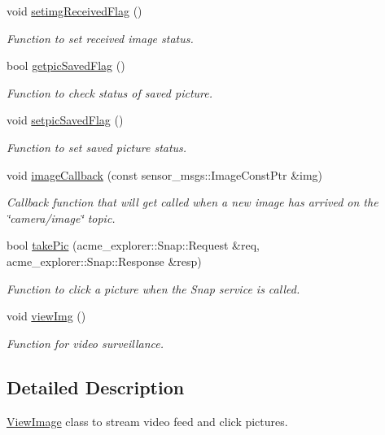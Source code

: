 \begin{DoxyCompactItemize}
void \hyperlink{classViewImage_a3ca482c5f91db23474d690c603c13b1c}{setimg\+Received\+Flag} ()
\begin{DoxyCompactList}\small\item\em Function to set received image status. \end{DoxyCompactList}\item 
bool \hyperlink{classViewImage_a1747ed0dfbc89fbea8e1d865c5786c41}{getpic\+Saved\+Flag} ()
\begin{DoxyCompactList}\small\item\em Function to check status of saved picture. \end{DoxyCompactList}\item 
void \hyperlink{classViewImage_afd3a1cb064bae769a8e91e53692a0220}{setpic\+Saved\+Flag} ()
\begin{DoxyCompactList}\small\item\em Function to set saved picture status. \end{DoxyCompactList}\item 
void \hyperlink{classViewImage_ac13c93f43b68aa64cfe0d62bd2afbfd2}{image\+Callback} (const sensor\+\_\+msgs\+::\+Image\+Const\+Ptr \&img)
\begin{DoxyCompactList}\small\item\em Callback function that will get called when a new image has arrived on the \char`\"{}camera/image\char`\"{} topic. \end{DoxyCompactList}\item 
bool \hyperlink{classViewImage_a6382f6a3ce6dfe80c9846bb74c570f7f}{take\+Pic} (acme\+\_\+explorer\+::\+Snap\+::\+Request \&req, acme\+\_\+explorer\+::\+Snap\+::\+Response \&resp)
\begin{DoxyCompactList}\small\item\em Function to click a picture when the Snap service is called. \end{DoxyCompactList}\item 
void \hyperlink{classViewImage_af15c58845d674897313ba7e8247965e4}{view\+Img} ()
\begin{DoxyCompactList}\small\item\em Function for video surveillance. \end{DoxyCompactList}\end{DoxyCompactItemize}


\subsection{Detailed Description}
\hyperlink{classViewImage}{View\+Image} class to stream video feed and click pictures. 

